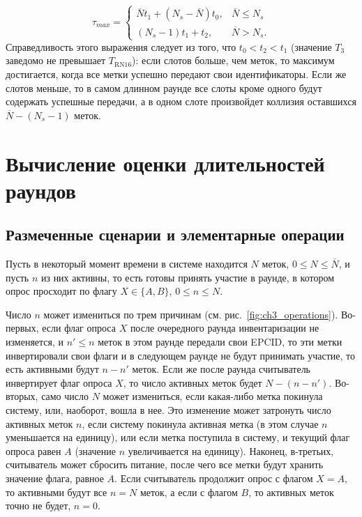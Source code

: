 \begin{equation}\label{eq:ch3_max_round_duration}
	\tau_{max} = \begin{cases}
 		\overline{N} t_1 + (N_s - \overline{N}) t_0, &\overline{N} \leqslant N_s\\
 		(N_s - 1) t_1 + t_2, &\overline{N} > N_s.
 	\end{cases}
\end{equation}
Справедливость этого выражения следует из того, что $t_0 < t_2 < t_1$ (значение $T_3$ заведомо не превышает $T_\text{RN16}$): если слотов больше, чем меток, то максимум достигается, когда все метки успешно передают свои идентификаторы. Если же слотов меньше, то в самом длинном раунде все слоты кроме одного будут содержать успешные передачи, а в одном слоте произвойдет коллизия оставшихся $\overline{N} - (N_s - 1)$ меток.



\section{Вычисление оценки длительностей раундов}\label{sec:ch3_round_durations}

\subsection{Размеченные сценарии и элементарные операции}
Пусть в некоторый момент времени в системе находится $N$ меток, $0 \leqslant N \leqslant \overline{N}$, и пусть $n$ из них активны, то есть готовы принять участие в раунде, в котором опрос просходит по флагу $X \in \{A, B\}$, $0 \leqslant n \leqslant N$.

Число $n$ может измениться по трем причинам (см. рис.~\ref{fig:ch3_operations}). Во-первых, если флаг опроса $X$ после очередного раунда инвентаризации не изменяется, и $n' \leqslant n$ меток в этом раунде передали свои EPCID, то эти метки инвертировали свои флаги и в следующем раунде не будут принимать участие, то есть активными будут $n - n'$ меток. Если же после раунда считыватель инвертирует флаг опроса $X$, то число активных меток будет $N - (n - n')$. Во-вторых, само число $N$ может измениться, если какая-либо метка покинула систему, или, наоборот, вошла в нее. Это изменение может затронуть число активных меток $n$, если систему покинула активная метка (в этом случае $n$ уменьшается на единицу), или если метка поступила в систему, и текущий флаг опроса равен $A$ (значение $n$ увеличивается на единицу). Наконец, в-третьих, считыватель может сбросить питание, после чего все метки будут хранить значение флага, равное $A$. Если считыватель продолжит опрос с флагом $X = A$, то активными будут все $n = N$ меток, а если с флагом $B$, то активных меток точно не будет, $n = 0$.

